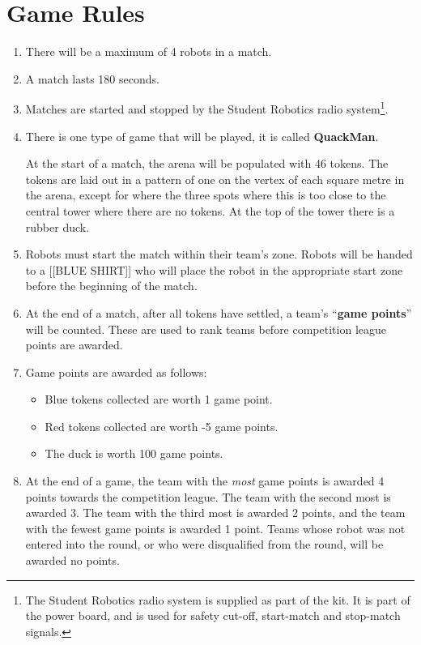 \section {Game Rules}
\label{game-rules}

\begin{enumerate}
\item There will be a maximum of 4 robots in a match.
\item A match lasts 180 seconds.
\item Matches are started and stopped by the Student Robotics radio system\footnote{The Student Robotics radio system is supplied as part of the kit.
 It is part of the power board, and is used for safety cut-off, start-match and stop-match signals.}.
\item There is one type of game that will be played, it is called \textbf{QuackMan}.

At the start of a match, the arena will be populated with 46 tokens.
The tokens are laid out in a pattern of one on the vertex of each square metre in the arena, except for where the three spots where this is too close to the central tower where there are no tokens.
At the top of the tower there is a rubber duck.

\item Robots must start the match within their team's zone.
 Robots will be handed to a [[BLUE SHIRT]] who will place the robot in the appropriate start zone before the beginning of the match.

\item At the end of a match, after all tokens have settled, a team's ``\textbf{game points}'' will be counted.
 These are used to rank teams before competition league points are awarded.

\item Game points are awarded as follows:
\begin{itemize}
\item Blue tokens collected are worth 1 game point.
\item Red tokens collected are worth -5 game points.
\item The duck is worth 100 game points.
\end{itemize}

\item At the end of a game, the team with the \emph{most} game points is awarded 4 points towards the competition league.
 The team with the second most is awarded 3.
 The team with the third most is awarded 2 points, and the team with the fewest game points is awarded 1 point.
 Teams whose robot was not entered into the round, or who were disqualified from the round, will be awarded no points.

\end{enumerate}
